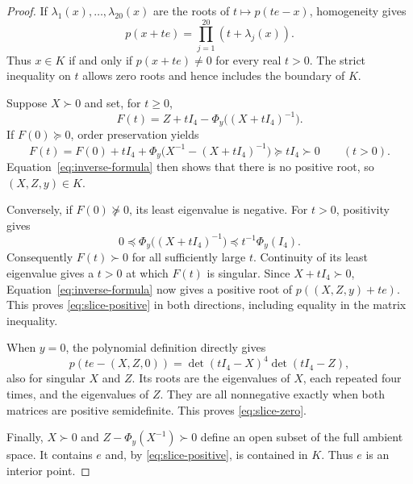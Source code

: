 \begin{proof}
If $\lambda_1(x),\ldots,\lambda_{20}(x)$ are the roots of
$t\mapsto p(te-x)$, homogeneity gives
\[
 p(x+te)=\prod_{j=1}^{20}(t+\lambda_j(x)).
\]
Thus $x\in K$ if and only if $p(x+te)\ne0$ for every real $t>0$.
The strict inequality on $t$ allows zero roots and hence includes
the boundary of $K$.

Suppose $X\succ0$ and set, for $t\ge0$,
\[
 F(t)=Z+tI_4-\Phi_y\bigl((X+tI_4)^{-1}\bigr).
\]
If $F(0)\succeq0$, order preservation yields
\[
 F(t)=F(0)+tI_4+
 \Phi_y\bigl(X^{-1}-(X+tI_4)^{-1}\bigr)
 \succeq tI_4\succ0\qquad(t>0).
\]
Equation~\eqref{eq:inverse-formula} then shows that there is no
positive root, so $(X,Z,y)\in K$.

Conversely, if $F(0)\not\succeq0$, its least eigenvalue is negative.
For $t>0$, positivity gives
\[
 0\preceq\Phi_y\bigl((X+tI_4)^{-1}\bigr)
 \preceq t^{-1}\Phi_y(I_4).
\]
Consequently $F(t)\succ0$ for all sufficiently large $t$.
Continuity of its least eigenvalue gives a $t>0$ at which $F(t)$
is singular.  Since $X+tI_4\succ0$,
Equation~\eqref{eq:inverse-formula} now gives a positive root of
$p((X,Z,y)+te)$.  This proves \eqref{eq:slice-positive} in both
directions, including equality in the matrix inequality.

When $y=0$, the polynomial definition directly gives
\[
 p(te-(X,Z,0))=\det(tI_4-X)^4\det(tI_4-Z),
\]
also for singular $X$ and $Z$.  Its roots are the eigenvalues of $X$,
each repeated four times, and the eigenvalues of $Z$.
They are all nonnegative exactly when both matrices are positive
semidefinite.  This proves \eqref{eq:slice-zero}.

Finally, $X\succ0$ and $Z-\Phi_y(X^{-1})\succ0$ define an open
subset of the full ambient space.  It contains $e$ and, by
\eqref{eq:slice-positive}, is contained in $K$.  Thus $e$ is an
interior point.
\end{proof}
